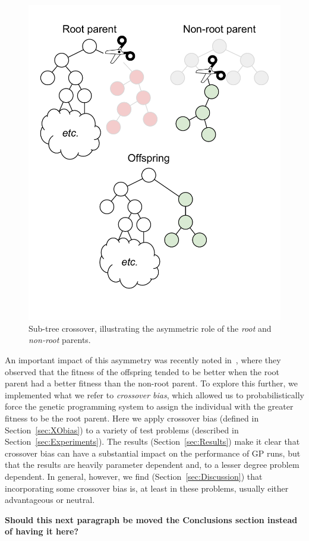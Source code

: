 \documentclass{sig-alternate}
\begin{document}
\begin{figure}
\centering
\includegraphics[width=0.45 \textwidth]{Plots/Root_parent_illustration_no_triangle.pdf}
\caption{Sub-tree crossover, illustrating the asymmetric role of the \emph{root} and \emph{non-root} parents.}
\label{fig:root_parent_illustration}
\end{figure}

An important impact of this asymmetry was recently noted in~\cite{McPheeDonatucciDramdahl:2014},
where they observed that the fitness of the offspring tended to be better when the root parent had a better 
fitness than
the non-root parent.
To explore this further, we implemented what we refer to \emph{crossover bias}, which allowed us to
probabilistically force the genetic programming system to assign the individual with the greater 
fitness to be the root parent. Here we apply crossover bias (defined in Section~\ref{sec:XObias}) 
to a variety of test problems (described in Section~\ref{sec:Experiments}). The results 
(Section~\ref{sec:Results}) make it clear that crossover bias can have a substantial impact on the 
performance of GP runs, but that the results are heavily parameter dependent and, to a lesser degree 
problem dependent. In general, however, we find (Section~\ref{sec:Discussion}) that incorporating 
some crossover bias is, at least in these problems, usually either advantageous or neutral. 

\textbf{Should this next paragraph be moved the Conclusions section instead of having it here?}
\end{document}
